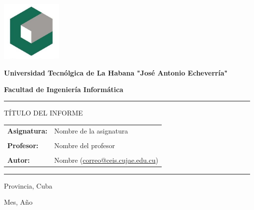 \documentclass[12pt]{article}
\begin{document}
\begin{titlepage}
    \begin{center} 
    \includegraphics[width=3cm]{img/Bandera_Cujae.jpg}  %
    
    \vspace*{0.2cm}
    \large \textbf{Universidad Tecnólgica de La Habana "José Antonio Echeverría"}   %
    
    \vspace*{0.1cm}
    \large \textbf{Facultad de Ingeniería Informática}  %
    \vfill
    \hrule
    \vspace*{0.7cm}
    \Large TÍTULO DEL INFORME
    
    \vspace*{0.5cm}
    \begin{table}[h]
        \begin{center}
        \begin{tabular}{ll}
            \large \textbf{Asignatura:} & Nombre de la asignatura\\
                                        &\\
            \large \textbf{Profesor:}   & Nombre del profesor\\
                                        &\\                                                      
            \large \textbf{Autor:}    & Nombre (\href{correo@ceis.cujae.edu.cu}{correo@ceis.cujae.edu.cu})                                   
        \end{tabular}
        \end{center}
        \end{table} 
    
    \hrule 
    \vfill
    \vspace*{3.2cm}
    \large Provincia, Cuba 

    \vspace*{0.1cm}
    \large Mes, Año
    \end{center}
    \end{titlepage}
\end{document}
